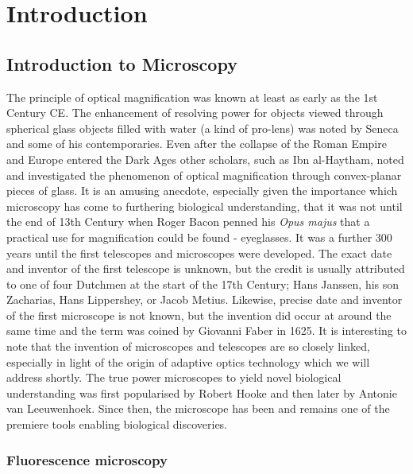 \chapter{Introduction}

\section{Introduction to Microscopy}
\label{sec:microscopy}

The principle of optical magnification was known at least as early 
as the 1st Century CE. The enhancement of resolving power for 
objects viewed through spherical glass objects filled with water 
(a kind of pro-lens) was noted by Seneca and some of his 
contemporaries\cite{seneca1971naturales}. Even after the collapse 
of the Roman Empire and Europe entered the Dark Ages other scholars, 
such as Ibn al-Haytham, noted and investigated the phenomenon of 
optical magnification through convex-planar pieces of 
glass\cite{nasr1968science}. It is an amusing anecdote, especially 
given the importance which microscopy has come to furthering 
biological understanding, that it was not until the end of 13th 
Century  when Roger Bacon penned his \textit{Opus majus} that a 
practical use for magnification could be found - eyeglasses. It 
was a further 300 years until the first telescopes and microscopes 
were developed. The exact date and inventor of the first telescope 
is unknown, but the credit is usually attributed to one of four 
Dutchmen at the start of the 17th Century; Hans Janssen, his son 
Zacharias, Hans Lippershey, or Jacob Metius. Likewise, precise date 
and inventor of the first microscope is not known, but the invention 
did occur at around the same time and the term was coined by Giovanni 
Faber in 1625\cite{bardell2004invention}. It is interesting to note 
that the invention of microscopes and telescopes are so closely linked, 
especially in light of the origin of adaptive optics technology which 
we will address shortly. The true power microscopes to yield novel 
biological understanding was first popularised by Robert Hooke and then
later by Antonie van 
Leeuwenhoek\cite{hooke1665micrographia, chung2017pioneers}. Since then, 
the microscope has been and remains one of the premiere tools enabling 
biological discoveries.

\subsection{Fluorescence microscopy}
\label{subsec:fluorescence}

